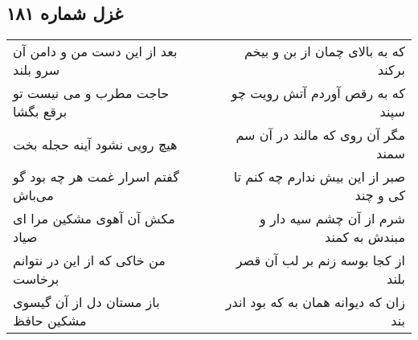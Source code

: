 \begin{center}
\section*{غزل شماره ۱۸۱}
\label{sec:sh181}
\begin{longtable}{l p{0.5cm} r}
بعد از این دست من و دامن آن سرو بلند
&&
که به بالای چمان از بن و بیخم برکند
\\
حاجت مطرب و می نیست تو برقع بگشا
&&
که به رقص آوردم آتش رویت چو سپند
\\
هیچ رویی نشود آینه حجله بخت
&&
مگر آن روی که مالند در آن سم سمند
\\
گفتم اسرار غمت هر چه بود گو می‌باش
&&
صبر از این بیش ندارم چه کنم تا کی و چند
\\
مکش آن آهوی مشکین مرا ای صیاد
&&
شرم از آن چشم سیه دار و مبندش به کمند
\\
من خاکی که از این در نتوانم برخاست
&&
از کجا بوسه زنم بر لب آن قصر بلند
\\
باز مستان دل از آن گیسوی مشکین حافظ
&&
زان که دیوانه همان به که بود اندر بند
\\
\end{longtable}
\end{center}
